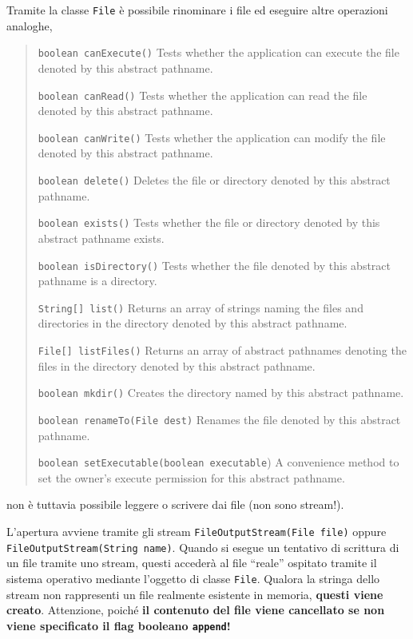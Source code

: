 \documentclass[\fontsizeclass,twocolumn]{\classname}
\theoremstyle{definition}
\theoremstyle{definition}
\begin{document}
Tramite la classe \texttt{File} è possibile rinominare i file ed eseguire altre
operazioni analoghe,

\begin{quote}
    \footnotesize{\texttt{boolean 	canExecute()} 	Tests whether the application can execute the file denoted by this abstract pathname.

\texttt{boolean 	canRead()} 	Tests whether the application can read the file denoted by this abstract pathname.

\texttt{boolean 	canWrite()} 	Tests whether the application can modify the file denoted by this abstract pathname.

\texttt{boolean 	delete()} 	Deletes the file or directory denoted by this abstract pathname.

\texttt{boolean 	exists()} 	Tests whether the file or directory denoted by this abstract pathname exists.

\texttt{boolean 	isDirectory()} 	Tests whether the file denoted by this abstract pathname is a directory.

\texttt{String[] 	list()} 	Returns an array of strings naming the files and directories in the directory denoted by this abstract pathname.

\texttt{File[] 	listFiles()} 	Returns an array of abstract pathnames denoting the files in the directory denoted by this abstract pathname.

\texttt{boolean 	mkdir()} 	Creates the directory named by this abstract pathname.

\texttt{boolean 	renameTo(File dest)} 	Renames the file denoted by this abstract pathname.

\texttt{boolean 	setExecutable(boolean executable}) 	A convenience method to set the owner's execute permission for this abstract pathname.}
\end{quote}

non è tuttavia possibile leggere o scrivere dai file (non sono stream!). 

L'apertura avviene tramite gli stream \texttt{FileOutputStream(File file)} oppure
\texttt{FileOutputStream(String name)}. Quando si esegue un tentativo di
scrittura di un file tramite uno stream, questi accederà al file ``reale''
ospitato tramite il sistema operativo mediante l'oggetto di classe
\texttt{File}. Qualora la stringa dello stream non rappresenti un file
realmente esistente in memoria, \textbf{questi viene creato}. Attenzione,
poiché \textbf{il contenuto del file viene cancellato se non viene specificato
il flag booleano \texttt{append}!}
\end{document}
